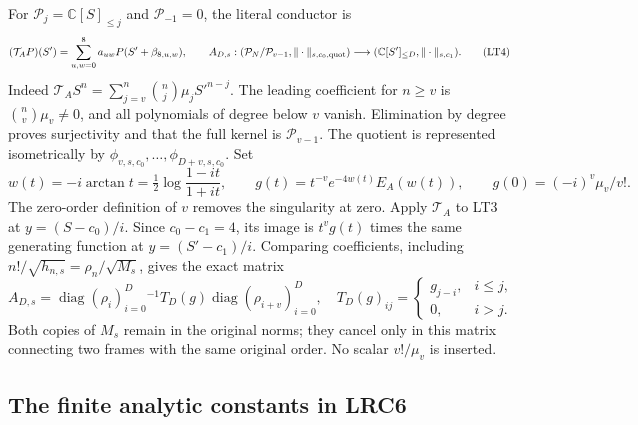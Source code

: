 For $\mathcal P_j=\mathbb C[S]_{\le j}$ and
$\mathcal P_{-1}=0$, the literal conductor is
\[
 (\mathcal T_AP)(S')=\sum_{u,w=0}^{8}a_{uw}P(S'+\beta_{8,u,w}),
 \qquad
 A_{D,s}:(\mathcal P_N/\mathcal P_{v-1},\|\cdot\|_{s,c_0,\rm quot})
       \longrightarrow(\mathbb C[S']_{\le D},\|\cdot\|_{s,c_1}).
                                                               \tag{LT4}
\]
Indeed $\mathcal T_AS^n=\sum_{j=v}^n\binom nj\mu_jS'^{n-j}$.
The leading coefficient for $n\ge v$ is $\binom nv\mu_v\ne0$,
and all polynomials of degree below $v$ vanish. Elimination by degree
proves surjectivity and that the full kernel is $\mathcal P_{v-1}$.
The quotient is represented isometrically by
$\phi_{v,s,c_0},\ldots,\phi_{D+v,s,c_0}$.
Set
\[
 w(t)=-i\arctan t=\tfrac12\log\frac{1-it}{1+it},\qquad
 g(t)=t^{-v}e^{-4w(t)}E_A(w(t)),\qquad
 g(0)=(-i)^v\mu_v/v! .                                  \tag{LT5}
\]
The zero-order definition of $v$ removes the singularity at zero.
Apply $\mathcal T_A$ to LT3 at $y=(S-c_0)/i$.
Since $c_0-c_1=4$, its image is $t^vg(t)$ times the same generating
function at $y=(S'-c_1)/i$. Comparing coefficients, including
$n!/\sqrt{h_{n,s}}=\rho_n/\sqrt{M_s}$, gives the exact matrix
\[
 A_{D,s}=\operatorname{diag}(\rho_i)_{i=0}^D^{-1}
             T_D(g)\operatorname{diag}(\rho_{i+v})_{i=0}^D,
 \quad T_D(g)_{ij}=\begin{cases}g_{j-i},&i\le j,\\0,&i>j.\end{cases}
                                                               \tag{LT6}
\]
Both copies of $M_s$ remain in the original norms; they cancel only
in this matrix connecting two frames with the same original order.
No scalar $v!/\mu_v$ is inserted.

\subsection{The finite analytic constants in LRC6}


